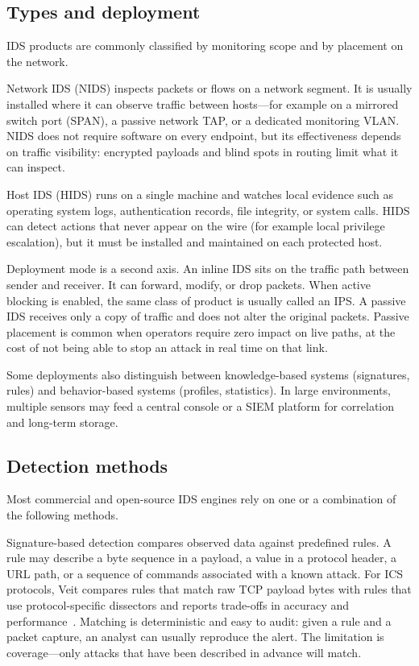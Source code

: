 \documentclass[../main.tex]{subfiles}
\begin{document}
\subsection{Types and deployment}

IDS products are commonly classified by monitoring scope and by placement on the network.

Network IDS (NIDS) inspects packets or flows on a network segment. It is usually installed where it can observe traffic between hosts---for example on a mirrored switch port (SPAN), a passive network TAP, or a dedicated monitoring VLAN. NIDS does not require software on every endpoint, but its effectiveness depends on traffic visibility: encrypted payloads and blind spots in routing limit what it can inspect.

Host IDS (HIDS) runs on a single machine and watches local evidence such as operating system logs, authentication records, file integrity, or system calls. HIDS can detect actions that never appear on the wire (for example local privilege escalation), but it must be installed and maintained on each protected host.

Deployment mode is a second axis. An inline IDS sits on the traffic path between sender and receiver. It can forward, modify, or drop packets. When active blocking is enabled, the same class of product is usually called an IPS. A passive IDS receives only a copy of traffic and does not alter the original packets. Passive placement is common when operators require zero impact on live paths, at the cost of not being able to stop an attack in real time on that link.

Some deployments also distinguish between knowledge-based systems (signatures, rules) and behavior-based systems (profiles, statistics). In large environments, multiple sensors may feed a central console or a SIEM platform for correlation and long-term storage.

\subsection{Detection methods}

Most commercial and open-source IDS engines rely on one or a combination of the following methods.

Signature-based detection compares observed data against predefined rules. A rule may describe a byte sequence in a payload, a value in a protocol header, a URL path, or a sequence of commands associated with a known attack. For ICS protocols, Veit compares rules that match raw TCP payload bytes with rules that use protocol-specific dissectors and reports trade-offs in accuracy and performance~\cite{veit2021ics_dissectors}. Matching is deterministic and easy to audit: given a rule and a packet capture, an analyst can usually reproduce the alert. The limitation is coverage---only attacks that have been described in advance will match.
\end{document}
